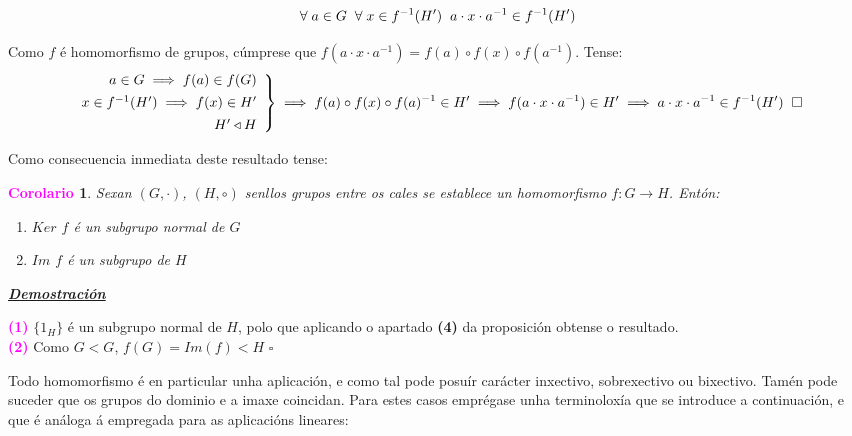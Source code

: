 \documentclass[twoside]{report}
\newcommand{\magbf}[1]{\textcolor{magenta}{\textbf{#1}}} %
\theoremstyle{mystyle}
\newtheorem{cor}{\magbf{Corolario}}[chapter]
\newenvironment{corollary}
{\begin{mdframed}[linecolor = magenta,backgroundcolor = classicrose, linewidth = 2mm]\begin{cor}}
{\end{cor}\end{mdframed}}
\begin{document}
$$\forall \hspace{1mm} a \in G \hspace{2MM} \forall \hspace{1mm} x \in f^{-1}(H') \hspace{2mm} a \cdot x \cdot a^{-1} \in f^{-1}(H')$$

\noindent Como $f$ é homomorfismo de grupos, cúmprese que $f(a \cdot x \cdot a^{-1}) = f(a) \circ f(x) \circ f(a^{-1})$. Tense: 
\[ 
\left. \begin{array}{r} 
a \in G \implies f(a) \in f(G)\\[1ex]
x \in f^{-1}(H') \implies f(x) \in H'\\[1ex]
H' \triangleleft H
\end{array} \right\} 
\implies f(a) \circ f(x) \circ f(a)^{-1} \in H' \implies f(a \cdot x \cdot a^{-1}) \in H' \implies a \cdot x \cdot a^{-1} \in f^{-1}(H')\hspace{2MM} \square
\]

\vspace{3mm}

\noindent Como consecuencia inmediata deste resultado tense: \\

\begin{corollary} \label{cor1.2}
Sexan $(G, \cdot)$, $(H, \circ)$ senllos grupos entre os cales se establece un homomorfismo $f: G \longrightarrow H$. Entón:
\begin{enumerate}
    \item $Ker$ $f$ é un subgrupo normal de $G$
    \item $Im$ $f$ é un subgrupo de $H$
\end{enumerate}
\end{corollary}

\noindent \textbf{\textit{\underline{Demostración}}}

\vspace{2mm}

\noindent \textcolor{magenta}{\textbf{(1)}} $\{1_{H}\}$ é un subgrupo normal de $H$, polo que aplicando o apartado \textbf{(4)} da proposición obtense o resultado. \\

\noindent \textcolor{magenta}{\textbf{(2)}} Como $G < G$, $f(G) = Im(f) < H$ \hspace{2MM} $\square$

\vspace{3mm}

\noindent Todo homomorfismo é en particular unha aplicación, e como tal pode posuír carácter inxectivo, sobrexectivo ou bixectivo. Tamén pode suceder que os grupos do dominio e a imaxe coincidan. Para estes casos emprégase unha terminoloxía que se introduce a continuación, e que é análoga á empregada para as aplicacións lineares: \\
\end{document}
